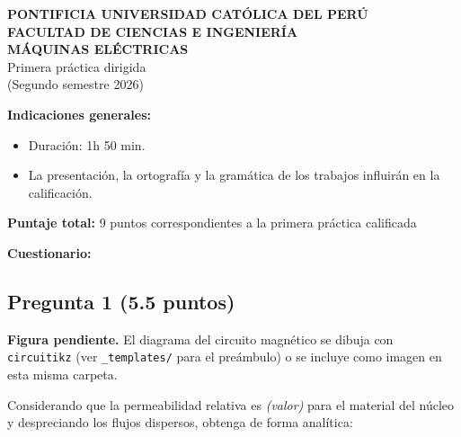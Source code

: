 \documentclass[
  spanish,
  11pt,
  a4paper,
]{article}
\begin{document}
\thispagestyle{fciprimera}

\begin{center}
{\bfseries PONTIFICIA UNIVERSIDAD CAT\'OLICA DEL PER\'U}\\
{\bfseries FACULTAD DE CIENCIAS E INGENIER\'IA}\\[1.4em]
{\bfseries MÁQUINAS ELÉCTRICAS}\\[0.3em]
{\large Primera práctica dirigida}\\[0.3em]
(Segundo semestre 2026)
\end{center}

\vspace{1.2em}

\noindent\textbf{Indicaciones generales:}
\begin{itemize}[leftmargin=1.6em, itemsep=0.15em, topsep=0.3em]
\item Duraci\'on: 1h 50 min.
\item La presentación, la ortografía y la gramática de los trabajos
influirán en la calificación.
\end{itemize}

\vspace{0.6em}
\noindent\textbf{Puntaje total:} 9 puntos correspondientes a la primera
práctica calificada

\vspace{0.8em}
\noindent\textbf{Cuestionario:}

\vspace{0.4em}

\subsection{Pregunta 1 (5.5 puntos)}\label{pregunta-1-5.5-puntos}

\begin{tcolorbox}[enhanced jigsaw, bottomrule=.15mm, rightrule=.15mm, colframe=quarto-callout-note-color-frame, breakable, arc=.35mm, opacityback=0, leftrule=.75mm, colback=white, toprule=.15mm, left=2mm]

\textbf{Figura pendiente.} El diagrama del circuito magnético se dibuja
con \texttt{circuitikz} (ver \texttt{\_templates/} para el preámbulo) o
se incluye como imagen en esta misma carpeta.

\end{tcolorbox}

Considerando que la permeabilidad relativa es \emph{(valor)} para el
material del núcleo y despreciando los flujos dispersos, obtenga de
forma analítica:
\end{document}
